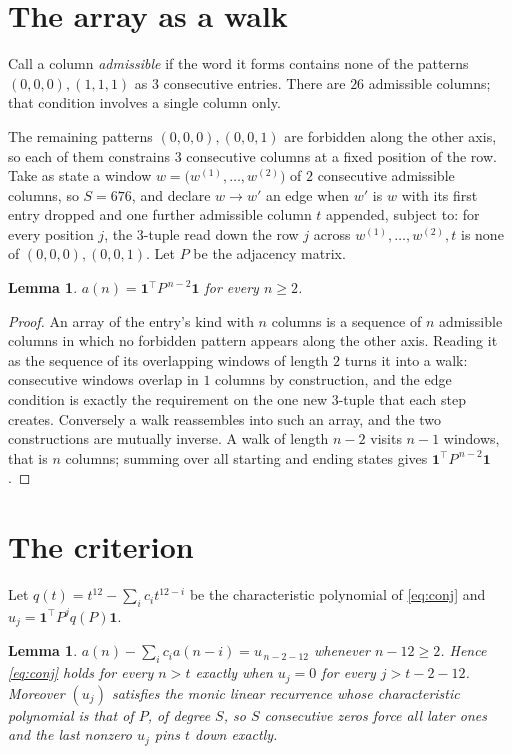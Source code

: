 \documentclass[11pt,a4paper]{article}
\theoremstyle{plain}
\newtheorem{lemma}[theorem]{Lemma}
\theoremstyle{definition}
\begin{document}
\section{The array as a walk}

Call a column \emph{admissible} if the word it forms contains none of the patterns
$(0,0,0), (1,1,1)$ as $3$ consecutive entries. There are $26$ admissible columns; that condition
involves a single column only.

The remaining patterns $(0,0,0), (0,0,1)$ are forbidden along the other axis, so each of them
constrains $3$ consecutive columns at a fixed position of the row. Take as state a
window $w=\bigl(w^{(1)},\dots,w^{(2)}\bigr)$ of $2$ consecutive admissible
columns, so $S=676$, and declare $w\to w'$ an edge when $w'$ is $w$ with its first entry
dropped and one further admissible column $t$ appended, subject to: for every position
$j$, the $3$-tuple read down the row $j$ across $w^{(1)},\dots,w^{(2)},t$
is none of $(0,0,0), (0,0,1)$. Let $P$ be the adjacency matrix.

\begin{lemma}\label{lem:walk}
$a(n)=\mathbf{1}^{\!\top}P^{\,n-2}\mathbf{1}$ for every $n\ge2$.
\end{lemma}

\begin{proof}
An array of the entry's kind with $n$ columns is a sequence of $n$ admissible columns in
which no forbidden pattern appears along the other axis. Reading it as the sequence of its
overlapping windows of length $2$ turns it into a walk: consecutive windows overlap in
$1$ columns by construction, and the edge condition is exactly the requirement on the one
new $3$-tuple that each step creates. Conversely a walk reassembles into such an array,
and the two constructions are mutually inverse. A walk of length $n-2$ visits $n-1$
windows, that is $n$ columns; summing over all starting and ending states gives
$\mathbf{1}^{\!\top}P^{\,n-2}\mathbf{1}$.
\end{proof}

\section{The criterion}

Let $q(t)=t^{12}-\sum_i c_i t^{12-i}$ be the characteristic polynomial of
\eqref{eq:conj} and $u_j=\mathbf{1}^{\!\top}P^{j}q(P)\mathbf{1}$.

\begin{lemma}\label{lem:crit}
$a(n)-\sum_i c_i a(n-i)=u_{\,n-2-12}$ whenever $n-12\ge2$. Hence
\eqref{eq:conj} holds for every $n>t$ exactly when $u_j=0$ for every
$j>t-2-12$. Moreover $(u_j)$ satisfies the monic linear recurrence whose
characteristic polynomial is that of $P$, of degree $S$, so $S$ consecutive zeros force all
later ones and the last nonzero $u_j$ pins $t$ down exactly.
\end{lemma}
\end{document}
